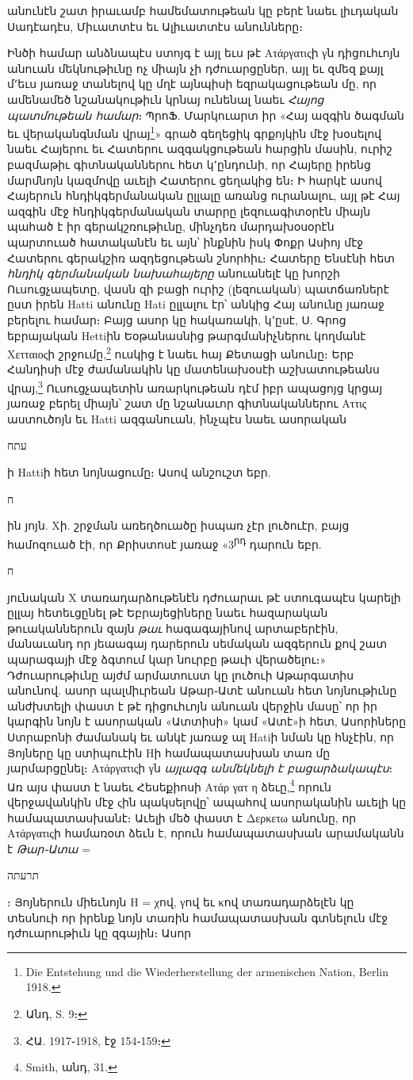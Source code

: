 \documentclass{article}
\begin{document}
{անունէն շատ իրաւամբ համեմատութեան կը բերէ նաեւ լիւդական Սադէադէս, Միւատտէս եւ Ալիւատտէս անունները։

Ինծի համար անձնապէս ստոյգ է այլ եւս թէ Ατάργατιςի γն դիցուհւոյն անուան մեկնութիւնը ոչ միայն չի դժուարցըներ, այլ եւ զմեզ քայլ մ՚եւս յառաջ տանելով կը մղէ այնպիսի եզրակացութեան մը, որ ամենամեծ նշանակութիւն կրնայ ունենալ նաեւ \emph{Հայոց պատմութեան համար}։ ՊրոՖ. Մարկուարտ իր «Հայ ազգին ծագման եւ վերականգնման վրայ\footnote{Die Entstehung und die Wiederherstellung der armenischen Nation, Berlin 1918.}» գրած գեղեցիկ գրքոյկին մէջ խօսելով նաեւ Հայերու եւ Հատերու ազգակցութեան հարցին մասին, ուրիշ բազմաթիւ գիտնականներու հետ կ՚ընդունի, որ Հայերը իրենց մարմնոյն կազմովը աւելի Հատերու ցեղակից են։ Ի հարկէ ասով Հայերուն հնդիկգերմանական ըլլալը առանց ուրանալու, այլ թէ Հայ ազգին մէջ հնդիկգերմանական տարրը լեզուագիտօրէն միայն պահած է իր գերակշռութիւնը, մինչդեռ մարդախօսօրէն պարտուած հատականէն եւ այն՝ ինքնին իսկ Փոքր Ասիոյ մէջ Հատերու գերակշիռ ազդեցութեան շնորհիւ։ Հատերը Ենսէնի հետ \emph{հնդիկ գերմանական նախահայերը} անուանելէ կը խորշի Ուսուցչապետը, վասն զի բացի ուրիշ (լեզուական) պատճառներէ ըստ իրեն Hatti անունը Hati ըլլալու էր՝ անկից Հայ անունը յառաջ բերելու համար։ Բայց ասոր կը հակառակի, կ՚ըսէ, Ս. Գրոց եբրայական Hettiին Եօթանասնից թարգմանիչներու կողմանէ Χετταιοςի շրջումը,\footnote{Անդ, S. 9։} ուսկից է նաեւ հայ Քետացի անունը։ Երբ Հանդիսի մէջ ժամանակին կը մատենախօսէի աշխատութեանս վրայ,\footnote{ՀԱ. 1917֊1918, էջ 154֊159։} Ուսուցչապետին առարկութեան դէմ իբր ապացոյց կրցայ յառաջ բերել միայն՝ շատ մը նշանաւոր գիտնականներու Αττις աստուծոյն եւ Hatti ազգանուան, ինչպէս նաեւ ասորական \begin{hebrewfont}עתח\end{hebrewfont}ի Hattiի հետ նոյնացումը։ Ասով անշուշտ եբր. \begin{hebrewfont}ח\end{hebrewfont}ին յոյն. Χի. շրջման առեղծուածը իսպառ չէր լուծուէր, բայց համոզուած էի, որ Քրիստոսէ յառաջ «3\textsuperscript{րդ} դարուն եբր. \begin{hebrewfont}ח\end{hebrewfont} յունական Χ տառադարձութենէն դժուարաւ թէ ստուգապէս կարելի ըլլայ հետեւցընել թէ Եբրայեցիները նաեւ հազարական թուականներուն զայն \emph{թաւ} հագագայինով արտաբերէին, մանաւանդ որ յեաագայ դարերուն սեմական ազգերուն քով շատ պարագայի մէջ ձգտում կար նուրբը թաւի վերածելու։» Դժուարութիւնը այժմ արմատուստ կը լուծուի Աթարգատիս անունով. ասոր պալմիւրեան Աթար֊Ատէ անուան հետ նոյնութիւնը անժխտելի փաստ է թէ դիցուհւոյն անուան վերջին մասը՝ որ իր կարգին նոյն է ասորական «Ատտիսի» կամ «Ատէ»ի հետ, Ասորիները Ստրաբոնի ժամանակ եւ անկէ յառաջ ալ Hatiի նման կը հնչէին, որ Յոյները կը ստիպուէին Hի համապատասխան տառ մը յարմարցընել։ Ατάργατιςի γն \emph{այլազգ անմեկնելի է բացարձակապէս}։ Առ այս փաստ է նաեւ Հեսեքիոսի Ατάρ γατ η ձեւը,\footnote{Smith, անդ, 31.} որուն վերջավանկին մէջ ςին պակսելովը՝ ապահով ասորականին աւելի կը համապատասխանէ։ Աւելի մեծ փաստ է Δερκετω անունը, որ Ατάργατιςի համառօտ ձեւն է, որուն համապատասխան արամականն է \emph{Թար֊Ատա} = \begin{hebrewfont}תרעתה\end{hebrewfont}։ Յոյներուն միեւնոյն H = χով, γով եւ κով տառադարձելէն կը տեսնուի որ իրենք նոյն տառին համապատասխան գտնելուն մէջ դժուարութիւն կը զգային։ Ասոր }
\end{document}
